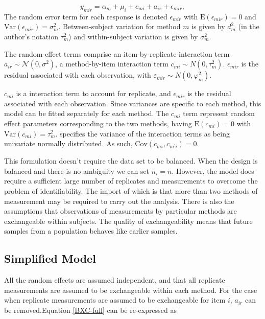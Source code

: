 \documentclass[12pt, a4paper]{report}
\theoremstyle{plain}
\theoremstyle{definition}
\theoremstyle{remark}
\begin{document}
\begin{equation}
y_{mir}  = \alpha_{m} + \mu_{i} + c_{mi} + a_{ir} + \epsilon_{mir},
\label{BXC-full}
\end{equation}
The random error term for each response is denoted $\epsilon_{mir}$ with $\mathrm{E}(\epsilon_{mir})=0$ and $\mathrm{Var}(\epsilon_{mir})=\sigma^2_m$. Between-subject variation for method $m$ is given by $d^2_{m}$ (in the author's notation $\tau^2_m$) and within-subject variation is given by $\sigma^2_{m}$.

The random-effect terms comprise an item-by-replicate interaction term $a_{ir} \sim \mathcal{N}(0,\sigma^{2})$, a method-by-item interaction term $c_{mi} \sim N(0,\tau^{2}_{m})$. $\epsilon_{mir}$ is the residual associated with each observation, with $\varepsilon_{mir} \sim N(0,\varphi^{2}_{m})$.

$c_{mi}$ is a interaction term to account for replicate, and $\epsilon_{mir}$ is the residual associated with each observation. Since variances are specific to each method, this model can be
fitted separately for each method. The $c_{mi}$ term represent random effect parameters corresponding to the two methods, having $\mathrm{E}(c_{mi})= 0$ with $\mathrm{Var}(c_{mi})=\tau^2_m$. \citet{BXC2008} specifies the variance of the interaction terms as being univariate normally distributed. As such, $\mathrm{Cov}(c_{mi}, c_{m^\prime i})= 0.$

This formulation doesn't require the data set to be balanced. When the design is balanced and there is no ambiguity we can set $n_i=n$. However, the model does require a sufficient large number of replicates and measurements to overcome the problem of identifiability. The import of which is that more than two methods of measurement may be required to carry out the analysis. There is also the assumptions that observations of measurements by particular methods are exchangeable within subjects. The quality of exchangeability means that future samples from a population behaves like earlier samples.



\subsection*{Simplified Model}
All the random effects are assumed independent, and that all replicate measurements are assumed to be exchangeable within each method. For the case when replicate measurements are assumed to be exchangeable for item $i$, $a_{ir}$ can be removed.Equation \ref{BXC-full} can be re-expressed as
\end{document}
